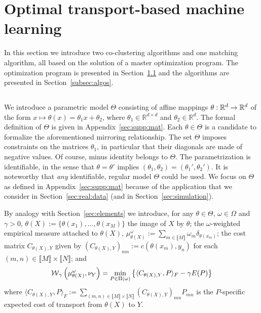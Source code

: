 \section{Optimal transport-based machine learning}
\label{sec:main}


In  this  section  we  introduce two  co-clustering  algorithms  and  one
  matching  algorithm, all  based on  the  solution of  a master  optimization
  program.      The      optimization     program     is      presented     in
  Section~\ref{subsec:method}   and   the    algorithms   are   presented   in
  Section~\ref{subsec:algos}.
  
  
\subsection{}
\label{subsec:method}

We  introduce  a  parametric  model $\Theta$  consisting  of  affine  mappings
$\theta      :      \mathbb{R}^{d}      \to     \mathbb{R}^{d}$      of      the      form
$x   \mapsto    \theta   (x)   =    \theta_{1}   x   +    \theta_{2}$,   where
$\theta_1\in\mathbb R^{d\times d}$ and $\theta_2\in\mathbb R^{d}$.  The formal
definition  of   $\Theta$  is  given  in   Appendix~\ref{sec:supp:mat}.   Each
$\theta \in \Theta$  is a candidate to formalize  the aforementioned mirroring
relationship.   The   set  $\Theta$   imposes  constraints  on   the  matrices
$\theta_{1}$,  in  particular  that  their  diagonals  are  made  of  negative
values. Of course, minus identity  belongs to $\Theta$. The parametrization is
identifiable,    in   the    sense   that    $\theta   =    \theta'$   implies
$(\theta_{1},\theta_{2}) = (\theta_{1}', \theta_{2}')$.  It is noteworthy that
\textit{any} identifiable, regular model $\Theta$  could be used.  We focus on
$\Theta$ as defined in  Appendix~\ref{sec:supp:mat} because of the application
that     we     consider     in    Section~\ref{sec:real:data}     (and     in
Section~\ref{sec:simulation}).

By   analogy   with   Section~\ref{sec:elements}   we   introduce,   for   any
$\theta   \in   \Theta$,    $\omega   \in   \Omega$   and    $\gamma   >   0$,
$\theta(X) :=  \{\theta(x_{1}), \ldots, \theta(x_{M})\}$  the image of  $X$ by
$\theta$;  the $\omega$-weighted  empirical measure  attached to  $\theta(X)$,
$\mu_{\theta(X)}^{\omega}  :=   \sum_{m\in\llbracket  M\rrbracket}  \omega_{m}
\delta_{\theta(x_{m})}$;   the   cost   matrix  $C_{\theta(X),Y}$   given   by
$(C_{\theta(X),Y})_{mn}     :=    c(\theta(x_{m}),     y_{n})$    for     each
$(m,n) \in \llbracket M\rrbracket \times \llbracket N\rrbracket$; and
\begin{equation}
  \label{eq:eq2}
  \operatorname{\mathcal{W}}_{\gamma}\left(\mu_{\theta(X)}^{\omega}, \nu_Y  \right) = \min_{P
    \in  \Pi(\omega)} \left\{\langle  C_{\theta(X),  Y},  P \rangle_F  -
    \gamma E(P)\right\}
\end{equation}
where
$\langle   C_{\theta(X),Y},  P   \rangle_F  :=   \sum_{(m,n)  \in   \llbracket
  M\rrbracket \times \llbracket N\rrbracket} (C_{\theta(X),Y})_{mn} P_{mn}$ is
the $P$-specific expected cost of transport from $\theta(X)$ to $Y$.



